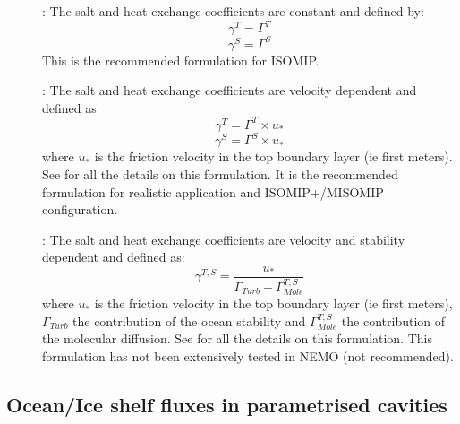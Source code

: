\documentclass[../main/NEMO_manual]{subfiles}
\begin{document}
     \begin{description}
        \item[]:
        The salt and heat exchange coefficients are constant and defined by:
\[
\gamma^{T} = \Gamma^{T}
\]
\[
\gamma^{S} = \Gamma^{S}
\] 
        This is the recommended formulation for ISOMIP.

	\item[]:
        The salt and heat exchange coefficients are velocity dependent and defined as
\[
\gamma^{T} = \Gamma^{T} \times u_{*} 
\]
\[
\gamma^{S} = \Gamma^{S} \times u_{*}
\]
        where $u_{*}$ is the friction velocity in the top boundary layer (ie first  meters).
        See \citet{jenkins.nicholls.ea_JPO10} for all the details on this formulation. It is the recommended formulation for realistic application and ISOMIP+/MISOMIP configuration.

	\item[]:
        The salt and heat exchange coefficients are velocity and stability dependent and defined as:
\[
\gamma^{T,S} = \frac{u_{*}}{\Gamma_{Turb} + \Gamma^{T,S}_{Mole}} 
\]
        where $u_{*}$ is the friction velocity in the top boundary layer (ie first  meters),
        $\Gamma_{Turb}$ the contribution of the ocean stability and
        $\Gamma^{T,S}_{Mole}$ the contribution of the molecular diffusion.
        See \citet{holland.jenkins_JPO99} for all the details on this formulation. 
        This formulation has not been extensively tested in NEMO (not recommended).
     \end{description}

\subsection{Ocean/Ice shelf fluxes in parametrised cavities}
\end{document}
